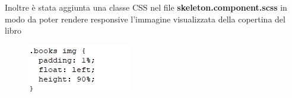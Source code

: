 \documentclass[a4paper,11pt]{report}
\begin{document}
Inoltre è stata aggiunta una classe CSS nel file \textbf{skeleton.component.scss} in modo da poter rendere responsive l'immagine visualizzata della copertina del libro
\begin{figure}[h]
	\includegraphics[width=0.3\linewidth]{css}
	\label{fig:css}
\end{figure}
\end{document}
